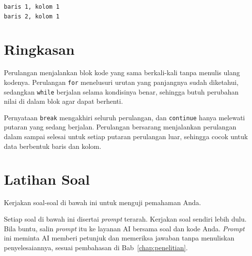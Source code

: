 \begin{lstlisting}[language=bash, caption={Keluaran nested_break.py}, label={lst:b5-nested-break-out}]
baris 1, kolom 1
baris 2, kolom 1
\end{lstlisting}

\section{Ringkasan}
Perulangan menjalankan blok kode yang sama berkali-kali tanpa menulis ulang kodenya. Perulangan \texttt{for} menelusuri urutan yang panjangnya sudah diketahui, sedangkan \texttt{while} berjalan selama kondisinya benar, sehingga butuh perubahan nilai di dalam blok agar dapat berhenti.

Pernyataan \texttt{break} mengakhiri seluruh perulangan, dan \texttt{continue} hanya melewati putaran yang sedang berjalan. Perulangan bersarang menjalankan perulangan dalam sampai selesai untuk setiap putaran perulangan luar, sehingga cocok untuk data berbentuk baris dan kolom.


\section{Latihan Soal}
Kerjakan soal-soal di bawah ini untuk menguji pemahaman Anda.

Setiap soal di bawah ini disertai \textit{prompt} terarah. Kerjakan soal sendiri lebih dulu. Bila buntu, salin \textit{prompt} itu ke layanan AI bersama soal dan kode Anda. \textit{Prompt} ini meminta AI memberi petunjuk dan memeriksa jawaban tanpa menuliskan penyelesaiannya, sesuai pembahasan di Bab~\ref{chap:penelitian}.

